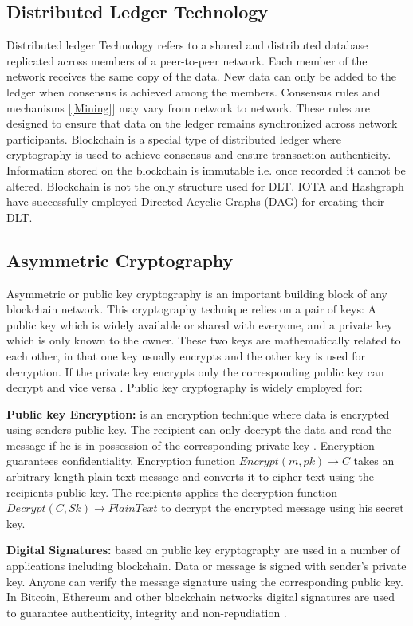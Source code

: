 \subsection{Distributed Ledger Technology} 
Distributed ledger Technology refers to a shared and distributed database replicated across members of a peer-to-peer network. Each member of the network receives the same copy of the data. New data can only be added to the ledger when consensus is achieved among the members. Consensus rules and mechanisms [\ref{Mining}] may vary from network to network. These rules are designed to ensure that data on the ledger remains synchronized across network participants. Blockchain is a special type of distributed ledger where cryptography is used to achieve consensus and ensure transaction authenticity.  Information stored on the blockchain is immutable i.e. once recorded it cannot be altered. Blockchain is not the only structure used for DLT. IOTA \cite{wiki:003} and Hashgraph have successfully employed Directed Acyclic Graphs (DAG) \cite{wiki:002} for creating their DLT. 
\vspace{0.5cm}
\subsection{Asymmetric Cryptography} \label{AC}
Asymmetric or public key cryptography is an important building block of any blockchain network. This cryptography technique relies on a pair of keys: A public key which is widely available or shared with everyone, and a private key which is only known to the owner. These two keys are mathematically related to each other, in that one key usually encrypts and the other key is used for decryption. If the private key encrypts only the corresponding public key can decrypt and vice versa \cite{wiki:004}. Public key cryptography is widely employed for:

\textbf{Public key Encryption:} is an encryption technique where data is encrypted using senders public key. The recipient can only decrypt the data and read the message if he is in possession of the corresponding private key \cite{wiki:004}. Encryption guarantees confidentiality. Encryption function $Encrypt(m,pk) \rightarrow C$ takes an arbitrary length plain text message and converts it to cipher text using the recipients public key. The recipients applies the decryption function $Decrypt(C,Sk) \rightarrow PlainText$ to decrypt the encrypted message using his secret key.

\textbf{Digital Signatures:} based on public key cryptography are used in a number of applications including blockchain. Data or message is signed with sender’s private key. Anyone can verify the message signature using the corresponding public key. In Bitcoin, Ethereum and other blockchain networks digital signatures are used to guarantee authenticity, integrity and non-repudiation \cite{wiki:004}.
\vspace{0.5cm}
